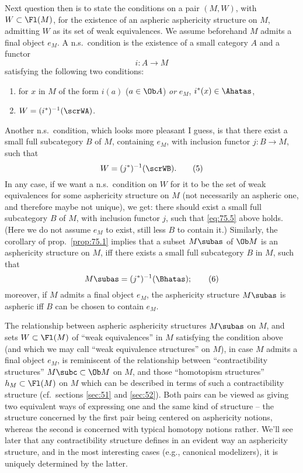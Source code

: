 Next question then is to state the conditions on a pair $(M,W)$, with
$W\subset\Fl(M)$, for the existence of an aspheric asphericity
structure on $M$, admitting $W$ as its set of weak
equivalences. We assume beforehand $M$ admits a final object $e_M$. A
n.s.\ condition is the existence of a small category $A$ and a functor
\[i:A\to M\]
satisfying the following two conditions:
\begin{enumerate}[label=(\roman*)]
\item\label{it:75.i}
  for $x$ in $M$ of the form $i(a)$ ($a\in\Ob A$) \emph{or} $e_M$,
  $i^*(x)\in\Ahatas$,
\item\label{it:75.ii}
  $W=(i^*)^{-1}(\scrWA)$.
\end{enumerate}
Another n.s.\ condition, which looks more pleasant I guess, is that
there exist a small full subcategory $B$ of $M$, containing $e_M$,
with inclusion functor $j:B\to M$, such that
\begin{equation}
  \label{eq:75.5}
  W=(j^*)^{-1}(\scrWB).\tag{5}
\end{equation}
In any case, if we want a n.s.\ condition on $W$ for it to be the set
of weak equivalences for some asphericity structure on $M$ (not
necessarily an aspheric one, and therefore maybe not unique), we get:
there should exist a small full subcategory $B$ of $M$, with inclusion
functor $j$, such that \eqref{eq:75.5} above holds. (Here we do not
assume $e_M$ to exist, still less $B$ to contain it.) Similarly, the
corollary of prop.\ \ref{prop:75.1} implies that a subset $M\subas$ of
$\Ob M$ is an asphericity structure on $M$, if{f} there exists a small
full subcategory $B$ in $M$, such that
\begin{equation}
  \label{eq:75.6}
  M\subas = (j^*)^{-1}(\Bhatas);\tag{6}
\end{equation}
moreover, if $M$ admits a final object $e_M$, the asphericity
structure $M\subas$ is aspheric if{f} $B$ can be chosen to contain
$e_M$.
\addtocounter{remarksnum}{1}
\begin{remarksnum}
  The relationship between aspheric asphericity structures $M\subas$
  on $M$, and sets $W \subset \Fl(M)$ of ``weak equivalences'' in $M$
  satisfying the condition above (and which we may call ``weak
  equivalence structures'' on $M$), in case $M$ admits a final object
  $e_M$, is reminiscent of the relationship between ``contractibility
  structures'' $M\subc\subset\Ob M$ on $M$, and those ``homotopism
  structures'' $h_M\subset\Fl(M)$ on $M$ which can be described in
  terms of such a contractibility structure (cf.\ sections
  \ref{sec:51} and \ref{sec:52}). Both pairs can be viewed as giving
  two equivalent ways of expressing one and the same kind of structure
  -- the structure concerned by the first pair being centered on
  asphericity notions, whereas the second is concerned with typical
  homotopy notions rather. We'll see later that any contractibility
  structure defines in an evident way an asphericity structure, and in
  the most interesting cases (e.g., canonical modelizers), it is
  uniquely determined by the latter.
\end{remarksnum}

